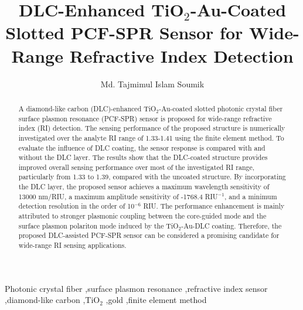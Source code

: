 \documentclass[preprint,12pt]{elsarticle}
\begin{document}
\begin{frontmatter}

\title{DLC-Enhanced TiO$_2$-Au-Coated Slotted PCF-SPR Sensor for Wide-Range Refractive Index Detection}

\author[inst1]{Md. Tajmimul Islam Soumik}


\begin{abstract}
A diamond-like carbon (DLC)-enhanced TiO$_2$-Au-coated slotted photonic crystal fiber surface plasmon resonance (PCF-SPR) sensor is proposed for wide-range refractive index (RI) detection. The sensing performance of the proposed structure is numerically investigated over the analyte RI range of 1.33-1.41 using the finite element method. To evaluate the influence of DLC coating, the sensor response is compared with and without the DLC layer. The results show that the DLC-coated structure provides improved overall sensing performance over most of the investigated RI range, particularly from 1.33 to 1.39, compared with the uncoated structure. By incorporating the DLC layer, the proposed sensor achieves a maximum wavelength sensitivity of 13000 nm/RIU, a maximum amplitude sensitivity of -1768.4 RIU$^{-1}$, and a minimum detection resolution in the order of 10$^{-6}$ RIU. The performance enhancement is mainly attributed to stronger plasmonic coupling between the core-guided mode and the surface plasmon polariton mode induced by the TiO$_2$-Au-DLC coating. Therefore, the proposed DLC-assisted PCF-SPR sensor can be considered a promising candidate for wide-range RI sensing applications.
\end{abstract}

\begin{keyword}
Photonic crystal fiber \sep surface plasmon resonance \sep refractive index sensor \sep diamond-like carbon \sep TiO$_2$ \sep gold \sep finite element method
\end{keyword}

\end{frontmatter}

\end{document}
